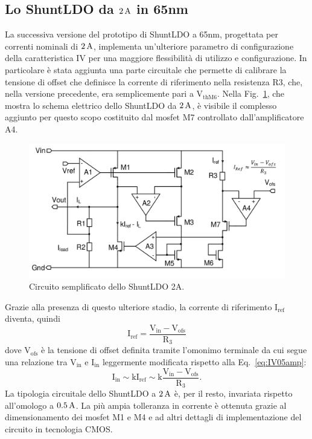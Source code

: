 \subsection{Lo ShuntLDO da $2\rm \, A$ in 65nm}

La successiva versione del prototipo di ShuntLDO a 65nm, progettata per correnti nominali di $2\rm \, A$, implementa un'ulteriore parametro di configurazione della caratteristica IV per una maggiore flessibilit\`a di utilizzo e configurazione. In particolare \`e stata aggiunta una parte circuitale che permette di calibrare la tensione di offset che definisce la corrente di riferimento nella resistenza R3, che, nella versione precedente, era semplicemente pari a $\mathrm{V_{thM6}}$. Nella Fig.~\ref{SLDO2A}, che mostra lo schema elettrico dello ShuntLDO da $2\rm \, A$, \`e visibile il complesso aggiunto per questo scopo costituito dal mosfet M7 controllato dall'amplificatore A4.
\begin{figure}
\centering
\includegraphics[width=\linewidth]{Immagini/SLDO2A}
\caption{Circuito semplificato dello ShuntLDO 2A.}
\label{SLDO2A}
\end{figure}
Grazie alla presenza di questo ulteriore stadio, la corrente di riferimento $\mathrm{I_{ref}}$ diventa, quindi
\begin{equation}
\mathrm{I_{ref} = \frac{V_{in} - V_{ofs}}{R_3}}
\end{equation}
dove $\mathrm{V_{ofs}}$ \`e la tensione di offset definita tramite l'omonimo terminale da cui segue una relazione tra $\mathrm{V_{in}}$ e $\mathrm{I_{in}}$ leggermente modificata rispetto alla Eq.~\ref{eq:IV05amp}: 
\begin{equation}
\mathrm{I_{in} \sim k I_{ref} \sim k \frac{V_{in} - V_{ofs}}{R_3}}.
\end{equation}
La tipologia circuitale dello ShuntLDO a $2\rm \, A$ \`e, per il resto, invariata rispetto all'omologo a $0.5\rm \, A$. La pi\`u ampia tolleranza in corrente \`e ottenuta grazie al dimensionamento dei mosfet M1 e M4 e ad altri dettagli di implementazione del circuito in tecnologia CMOS.

